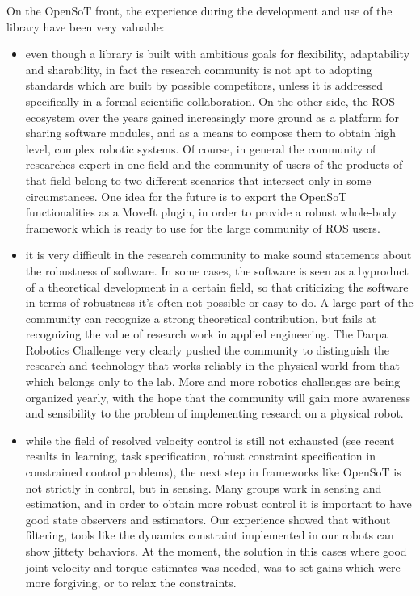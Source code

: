 \documentclass[%
	paper=A4,					%
	twoside=true,				%
	openright,			.
	parskip=full,				%
	chapterprefix=true,			%
	11pt,						%
	headings=normal,			%
	bibliography=totoc,			%
	listof=totoc,				%
	titlepage=on,				%
	captions=tableabove,		%
	draft=true,				%
]{scrreprt}%
\begin{document}
On the OpenSoT front, the experience during the development and use of the library have been very valuable:
\begin{itemize}
 \item even though a library is built with ambitious goals for flexibility, adaptability and sharability, in fact the research community is not apt to adopting standards which are built by possible competitors, unless it is addressed specifically in a formal scientific collaboration. On the other side, the ROS ecosystem over the years gained increasingly more ground as a platform for sharing software modules, and as a means to compose them to obtain high level, complex robotic systems. Of course, in general the community of researches expert in one field and the community of users of the products of that field belong to two different scenarios that intersect only in some circumstances. One idea for the future is to export the OpenSoT functionalities as a MoveIt plugin, in order to provide a robust whole-body framework which is ready to use for the large community of ROS users.
 \item it is very difficult in the research community to make sound statements about the robustness of software. In some cases, the software is seen as a byproduct of a theoretical development in a certain field, so that criticizing the software in terms of robustness it's often not possible or easy to do. A large part of the community can recognize a strong theoretical contribution, but fails at recognizing the value of research work in applied engineering. The Darpa Robotics Challenge very clearly pushed the community to distinguish the research and technology that works reliably in the physical world from that which belongs only to the lab. More and more robotics challenges are being organized yearly, with the hope that the community will gain more awareness and sensibility to the problem of implementing research on a physical robot.
 \item while the field of resolved velocity control is still not exhausted (see recent results in learning, task specification, robust constraint specification \cite{del2015robustness} in constrained control problems), the next step in frameworks like OpenSoT is not strictly in control, but in sensing. Many groups work in sensing and estimation, and in order to obtain more robust control it is important to have good state observers and estimators. Our experience showed that without filtering, tools like the dynamics constraint implemented in our robots can show jittety behaviors. At the moment, the solution in this cases where good joint velocity and torque estimates was needed, was to set gains which were more forgiving, or to relax the constraints.

\end{itemize}
\end{document}
